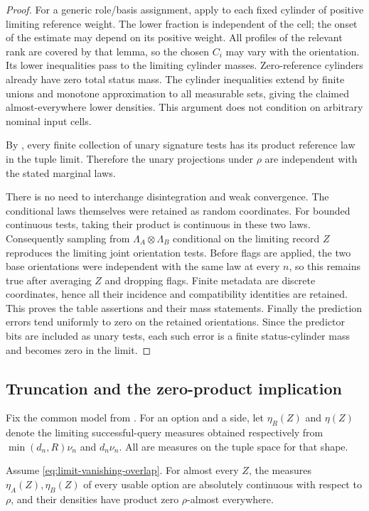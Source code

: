 \begin{proof}
For a generic role/basis assignment, apply
 to each fixed cylinder of positive limiting
reference weight. The lower fraction is independent of the cell;
the onset of the estimate may depend on its positive weight. All
profiles of the relevant rank are covered by that lemma, so the chosen
$C_i$ may vary with the orientation. Its lower inequalities pass to
the limiting cylinder masses. Zero-reference cylinders already have
zero total status mass. The cylinder inequalities extend by finite
unions and monotone approximation to all measurable sets, giving the
claimed almost-everywhere lower densities. This argument does not
condition on arbitrary nominal input cells.

By , every finite collection of unary
signature tests has its product reference law in the tuple limit.
Therefore the unary projections under $\rho$ are independent with the
stated marginal laws.

There is no need to interchange disintegration and weak convergence.
The conditional laws themselves were retained as random coordinates.
For bounded continuous tests, taking their product is continuous in
these two laws. Consequently sampling from
$\Lambda_A\otimes\Lambda_B$ conditional on the limiting record $Z$
reproduces the limiting joint orientation tests. Before flags are
applied, the two base orientations were independent with the same law
at every $n$, so this remains true after averaging $Z$ and dropping
flags. Finite metadata are discrete coordinates, hence all their
incidence and compatibility identities are retained. This proves the
table assertions and their mass statements. Finally the prediction
errors tend uniformly to zero on the retained orientations. Since the
predictor bits are included as unary tests, each such error is a finite
status-cylinder mass and becomes zero in the limit.
\end{proof}

\subsection{Truncation and the zero-product implication}

Fix the common model from . For an option and a
side, let $\eta_R(Z)$ and $\eta(Z)$ denote the limiting successful-query
measures obtained respectively from $\min(d_n,R)\nu_n$ and $d_n\nu_n$.
All are measures on the tuple space for that shape.

\begin{lemma}
\label{lem:limit-zero-product}
Assume \eqref{eq:limit-vanishing-overlap}. For almost every $Z$, the
measures $\eta_A(Z),\eta_B(Z)$ of every usable option are absolutely
continuous with respect to $\rho$, and their densities have product zero
$\rho$-almost everywhere.
\end{lemma}


